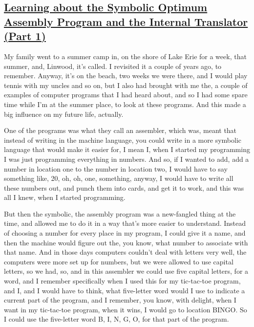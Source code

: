 \documentclass[]{article}
\begin{document}
\subsection{\texorpdfstring{\href{http://webofstories.com/play/17082}{Learning
about the Symbolic Optimum Assembly Program and the Internal Translator
(Part
1)}}{Learning about the Symbolic Optimum Assembly Program and the Internal Translator (Part 1)}}\label{learning-about-the-symbolic-optimum-assembly-program-and-the-internal-translator-part-1}

My family went to a summer camp in, on the shore of Lake Erie for a
week, that summer, and, Linwood, it's called. I revisited it a couple of
years ago, to remember. Anyway, it's on the beach, two weeks we were
there, and I would play tennis with my uncles and so on, but I also had
brought with me the, a couple of examples of computer programs that I
had heard about, and so I had some spare time while I'm at the summer
place, to look at these programs. And this made a big influence on my
future life, actually.

One of the programs was what they call an assembler, which was, meant
that instead of writing in the machine language, you could write in a
more symbolic language that would make it easier for, I mean I, when I
started my programming I was just programming everything in numbers. And
so, if I wanted to add, add a number in location one to the number in
location two, I would have to say something like, 20, oh, oh, one,
something, anyway, I would have to write all these numbers out, and
punch them into cards, and get it to work, and this was all I knew, when
I started programming.

But then the symbolic, the assembly program was a new-fangled thing at
the time, and allowed me to do it in a way that's more easier to
understand. Instead of choosing a number for every place in my program,
I could give it a name, and then the machine would figure out the, you
know, what number to associate with that name. And in those days
computers couldn't deal with letters very well, the computers were more
set up for numbers, but we were allowed to use capital letters, so we
had, so, and in this assembler we could use five capital letters, for a
word, and I remember specifically when I used this for my tic-tac-toe
program, and I, and I would have to think, what five-letter word would I
use to indicate a current part of the program, and I remember, you know,
with delight, when I want in my tic-tac-toe program, when it wins, I
would go to location BINGO. So I could use the five-letter word B, I, N,
G, O, for that part of the program.
\end{document}
